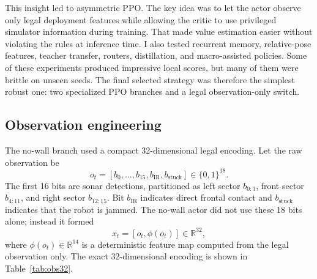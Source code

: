 \documentclass[11pt, oneside]{article}   	%
\begin{document}
This insight led to asymmetric PPO. The key idea was to let the actor observe only legal deployment features while allowing the critic to use privileged simulator information during training. That made value estimation easier without violating the rules at inference time. I also tested recurrent memory, relative-pose features, teacher transfer, routers, distillation, and macro-assisted policies. Some of these experiments produced impressive local scores, but many of them were brittle on unseen seeds. The final selected strategy was therefore the simplest robust one: two specialized PPO branches and a legal observation-only switch.

\subsection{Observation engineering}

The no-wall branch used a compact 32-dimensional legal encoding. Let the raw observation be
\[
o_t=[b_0,\ldots,b_{15},b_{\mathrm{IR}},b_{\mathrm{stuck}}]\in\{0,1\}^{18}.
\]
The first 16 bits are sonar detections, partitioned as left sector \(b_{0:3}\), front sector \(b_{4:11}\), and right sector \(b_{12:15}\). Bit \(b_{\mathrm{IR}}\) indicates direct frontal contact and \(b_{\mathrm{stuck}}\) indicates that the robot is jammed. The no-wall actor did not use these 18 bits alone; instead it formed
\[
x_t=[o_t,\phi(o_t)]\in\mathbb{R}^{32},
\]
where \(\phi(o_t)\in\mathbb{R}^{14}\) is a deterministic feature map computed from the legal observation only. The exact 32-dimensional encoding is shown in Table~\ref{tab:obs32}.
\end{document}
